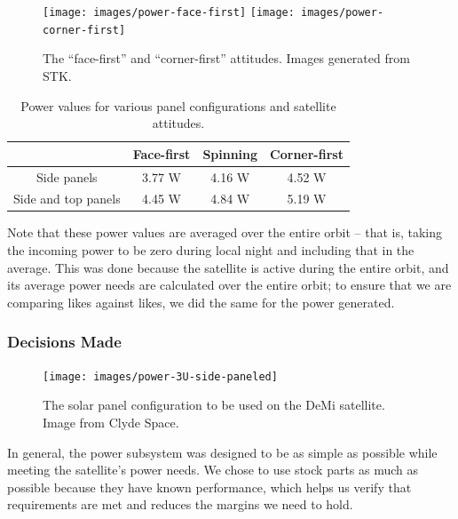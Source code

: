 \documentclass[12pt]{article}
\begin{document}
			\begin{figure}[ht]%
			\centering
			\texttt{[image: images/power-face-first]}%
			\hspace{0.5in}
			\texttt{[image: images/power-corner-first]}
			\caption{The ``face-first'' and ``corner-first'' attitudes.  Images generated from STK.}%
			\label{fig:power-face-first}%
			\end{figure}
			
			\begin{table}[ht]\label{table:power-trade-study}
\caption{Power values for various panel configurations and satellite attitudes.}
\begin{center}
    \begin{tabular}{|c|c|c|c|} \hline
    	 & Face-first & Spinning & Corner-first \\ \hline
Side panels & 3.77 W & 4.16 W & 4.52 W \\\hline
Side and top panels & 4.45 W & 4.84 W & 5.19 W \\\hline
    \end{tabular}
\end{center}
\end{table}

Note that these power values are averaged over the entire orbit -- that is, taking the incoming power to be zero during local night and including that in the average.  This was done because the satellite is active during the entire orbit, and its average power needs are calculated over the entire orbit; to ensure that we are comparing likes against likes, we did the same for the power generated.
			
			\subsubsection{Decisions Made}
			
			\begin{figure}%
			\centering
			\texttt{[image: images/power-3U-side-paneled]}%
			\caption{The solar panel configuration to be used on the DeMi satellite.  Image from Clyde Space.\cite{CS image}}%
			\label{fig:power-panels}%
			\end{figure}
			
In general, the power subsystem was designed to be as simple as possible while meeting the satellite's power needs.  We chose to use stock parts as much as possible because they have known performance, which helps us verify that requirements are met and reduces the margins we need to hold.
\end{document}

